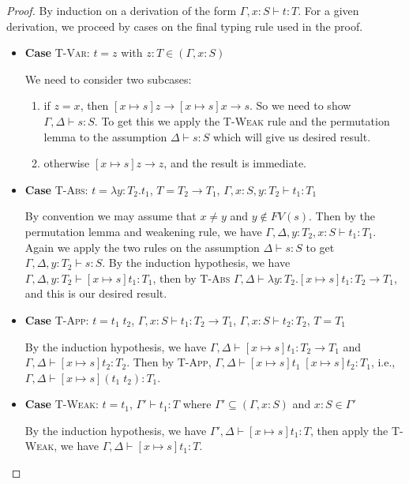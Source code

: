 \documentclass[conference]{IEEEtran}
\newcommand\lam[2]{\lambda #1.#2}
\begin{document}
\begin{proof}
	By induction on a derivation of the form $\Gamma,x:S\vdash t:T$. For a given derivation, we proceed by cases on the final typing rule used in the proof.
	\begin{itemize}		
		\item\textbf{Case} \textsc{T-Var}: $t=z$ with $z:T\in(\Gamma,x:S)$
		
		We need to consider two subcases: 
		\begin{enumerate}
			\item if $z=x$, then $[x\mapsto s]z\to[x\mapsto s]x\to s$. So we need to show $\Gamma,\Delta\vdash s:S$. To get this we apply the \textsc{T-Weak} rule and the permutation lemma to the assumption $\Delta\vdash s:S$ which will give us desired result.
			\item otherwise $[x\mapsto s]z\to z$, and the result is immediate.
		\end{enumerate}	
		
		\item\textbf{Case} \textsc{T-Abs}: $t=\lam{y:T_2}{t_1}$, $T=T_2\to T_1$, $\Gamma,x:S,y:T_2\vdash t_1:T_1$
		
		By convention we may assume that $x\ne y$ and $y\notin FV(s)$. Then by the permutation lemma and weakening rule, we have $\Gamma,\Delta,y:T_2,x:S\vdash t_1:T_1$. Again we apply the two rules on the assumption $\Delta\vdash s:S$ to get $\Gamma,\Delta,y:T_2\vdash s:S$. By the induction hypothesis, we have $\Gamma,\Delta,y:T_2\vdash [x\mapsto s]t_1:T_1$, then by \textsc{T-Abs} $\Gamma,\Delta\vdash \lam{y:T_2}{[x\mapsto s]t_1}:T_2\to T_1$, and this is our desired result.
		
		\item\textbf{Case} \textsc{T-App}: $t=t_1\; t_2$, $\Gamma,x:S\vdash t_1:T_2\to T_1$, $\Gamma,x:S\vdash t_2:T_2$, $T=T_1$
		
		By the induction hypothesis, we have $\Gamma,\Delta\vdash [x\mapsto s]t_1:T_2\to T_1$ and $\Gamma,\Delta\vdash [x\mapsto s]t_2:T_2$. Then by \textsc{T-App}, $\Gamma,\Delta\vdash [x\mapsto s]t_1\; [x\mapsto s]t_2:T_1$, i.e., $\Gamma,\Delta\vdash [x\mapsto s](t_1\; t_2):T_1$.
		
		\item\textbf{Case} \textsc{T-Weak}: $t=t_1$, $\Gamma'\vdash t_1:T$ where $\Gamma'\subseteq(\Gamma,x:S)$ and $x:S\in\Gamma'$
		
		By the induction hypothesis, we have $\Gamma',\Delta\vdash [x\mapsto s]t_1:T$, then apply the \textsc{T-Weak}, we have $\Gamma,\Delta\vdash [x\mapsto s]t_1:T$.
		

\end{itemize}
\end{proof}
\end{document}
